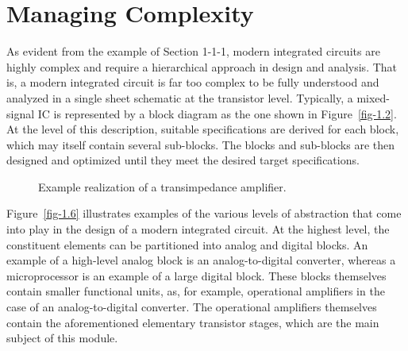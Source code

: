 \documentclass[
  11pt,
  letterpaper,
  abstract]{scrbook}
\begin{document}
\section{Managing Complexity}\label{managing-complexity}

As evident from the example of Section 1-1-1, modern integrated circuits
are highly complex and require a hierarchical approach in design and
analysis. That is, a modern integrated circuit is far too complex to be
fully understood and analyzed in a single sheet schematic at the
transistor level. Typically, a mixed-signal IC is represented by a block
diagram as the one shown in Figure~\ref{fig-1.2}. At the level of this
description, suitable specifications are derived for each block, which
may itself contain several sub-blocks. The blocks and sub-blocks are
then designed and optimized until they meet the desired target
specifications.

\begin{figure}


\caption{\label{fig-1.5}Example realization of a transimpedance
amplifier.}

\end{figure}%

Figure~\ref{fig-1.6} illustrates examples of the various levels of
abstraction that come into play in the design of a modern integrated
circuit. At the highest level, the constituent elements can be
partitioned into analog and digital blocks. An example of a high-level
analog block is an analog-to-digital converter, whereas a microprocessor
is an example of a large digital block. These blocks themselves contain
smaller functional units, as, for example, operational amplifiers in the
case of an analog-to-digital converter. The operational amplifiers
themselves contain the aforementioned elementary transistor stages,
which are the main subject of this module.
\end{document}
